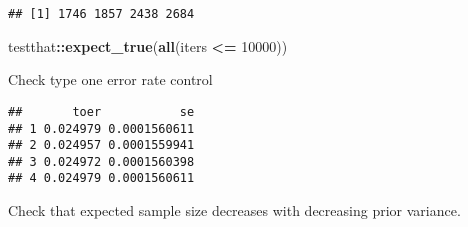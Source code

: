 \documentclass[]{book}
\newenvironment{Shaded}{\begin{snugshade}}{\end{snugshade}}
\newcommand{\ControlFlowTok}[1]{\textcolor[rgb]{0.13,0.29,0.53}{\textbf{#1}}}
\newcommand{\DataTypeTok}[1]{\textcolor[rgb]{0.13,0.29,0.53}{#1}}
\newcommand{\DecValTok}[1]{\textcolor[rgb]{0.00,0.00,0.81}{#1}}
\newcommand{\FloatTok}[1]{\textcolor[rgb]{0.00,0.00,0.81}{#1}}
\newcommand{\KeywordTok}[1]{\textcolor[rgb]{0.13,0.29,0.53}{\textbf{#1}}}
\newcommand{\NormalTok}[1]{#1}
\newcommand{\OperatorTok}[1]{\textcolor[rgb]{0.81,0.36,0.00}{\textbf{#1}}}
\newcommand{\StringTok}[1]{\textcolor[rgb]{0.31,0.60,0.02}{#1}}
\begin{document}
\begin{verbatim}
## [1] 1746 1857 2438 2684
\end{verbatim}

\begin{Shaded}
\begin{Highlighting}[]
\NormalTok{testthat}\OperatorTok{::}\KeywordTok{expect_true}\NormalTok{(}\KeywordTok{all}\NormalTok{(iters }\OperatorTok{<=}\StringTok{ }\DecValTok{10000}\NormalTok{))}
\end{Highlighting}
\end{Shaded}

Check type one error rate control

\begin{Shaded}
\end{Shaded}

\begin{verbatim}
##       toer           se
## 1 0.024979 0.0001560611
## 2 0.024957 0.0001559941
## 3 0.024972 0.0001560398
## 4 0.024979 0.0001560611
\end{verbatim}

Check that expected sample size decreases with decreasing prior variance.
\end{document}

